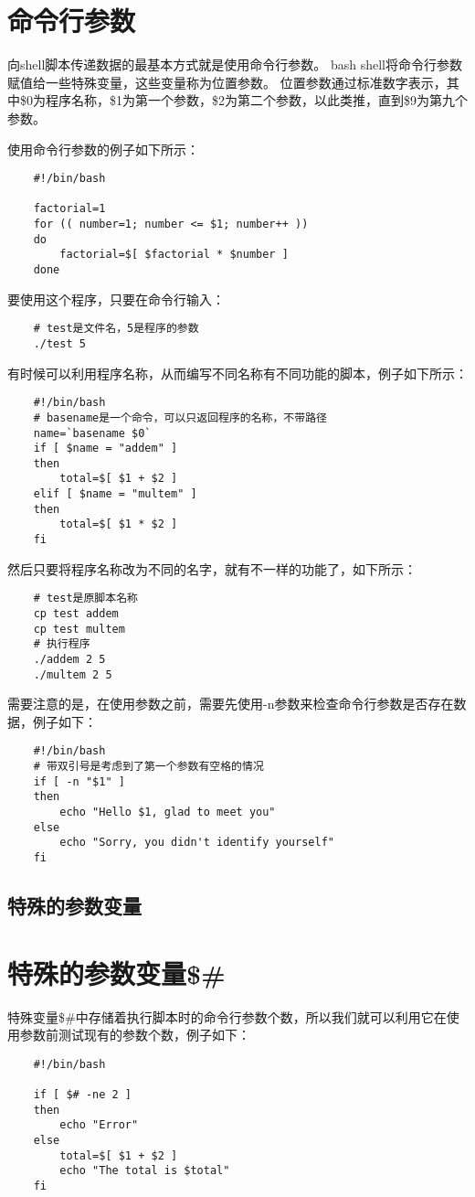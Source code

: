 \documentclass[a4paper,left=2.5cm,right=2.5cm,11pt]{article}
\begin{document}
\tableofcontents

\clearpage

\section{命令行参数}
	向shell脚本传递数据的最基本方式就是使用命令行参数。
	bash shell将命令行参数赋值给一些特殊变量，这些变量称为位置参数。
	位置参数通过标准数字表示，其中\$0为程序名称，\$1为第一个参数，\$2为第二个参数，以此类推，直到\$9为第九个参数。\par

	使用命令行参数的例子如下所示：
	\begin{lstlisting}
	#!/bin/bash

	factorial=1
	for (( number=1; number <= $1; number++ ))
	do
		factorial=$[ $factorial * $number ]
	done
	\end{lstlisting}

	要使用这个程序，只要在命令行输入：
	\begin{lstlisting}
	# test是文件名，5是程序的参数
	./test 5
	\end{lstlisting}

	有时候可以利用程序名称，从而编写不同名称有不同功能的脚本，例子如下所示：
	\begin{lstlisting}
	#!/bin/bash
	# basename是一个命令，可以只返回程序的名称，不带路径
	name=`basename $0`
	if [ $name = "addem" ]
	then
		total=$[ $1 + $2 ]
	elif [ $name = "multem" ]
	then
		total=$[ $1 * $2 ]
	fi
	\end{lstlisting}

	然后只要将程序名称改为不同的名字，就有不一样的功能了，如下所示：
	\begin{lstlisting}
	# test是原脚本名称
	cp test addem
	cp test multem
	# 执行程序
	./addem 2 5
	./multem 2 5
	\end{lstlisting}

	需要注意的是，在使用参数之前，需要先使用-n参数来检查命令行参数是否存在数据，例子如下：
	\begin{lstlisting}
	#!/bin/bash
	# 带双引号是考虑到了第一个参数有空格的情况
	if [ -n "$1" ]
	then
		echo "Hello $1, glad to meet you"
	else
		echo "Sorry, you didn't identify yourself"
	fi
	\end{lstlisting}

\subsection{特殊的参数变量}
\section{特殊的参数变量\$\#}
	特殊变量\$\#中存储着执行脚本时的命令行参数个数，所以我们就可以利用它在使用参数前测试现有的参数个数，例子如下：
	\begin{lstlisting}
	#!/bin/bash

	if [ $# -ne 2 ]
	then
		echo "Error"
	else
		total=$[ $1 + $2 ]
		echo "The total is $total"
	fi
	\end{lstlisting}
\end{document}
